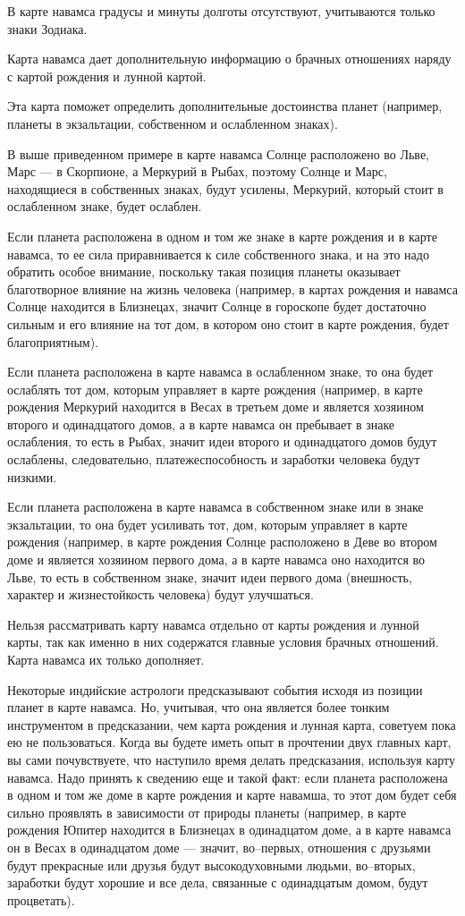 В карте навамса градусы и минуты долготы отсутствуют, учитываются только знаки Зодиака.

Карта навамса дает дополнительную информацию о брачных отношениях наряду с картой рождения и лунной картой.

Эта карта поможет определить дополнительные достоинства планет (например, планеты в экзальтации, собственном и ослабленном знаках).

В выше приведенном примере в карте навамса Солнце расположено во Льве, Марс --- в Скорпионе, а Меркурий в Рыбах, поэтому Солнце и Марс, находящиеся в собственных знаках, будут усилены, Меркурий, который стоит в ослабленном знаке, будет ослаблен.

Если планета расположена в одном и том же знаке в карте рождения и в карте навамса, то ее сила приравнивается к силе собственного знака, и на это надо обратить особое внимание, поскольку такая позиция планеты оказывает благотворное влияние на жизнь человека (например, в картах рождения и навамса Солнце находится в Близнецах, значит Солнце в гороскопе будет достаточно сильным и его влияние на тот дом, в котором оно стоит в карте рождения, будет благоприятным).

Если планета расположена в карте навамса в ослабленном знаке, то она будет ослаблять тот дом, которым управляет в карте рождения (например, в карте рождения Меркурий находится в Весах в третьем доме и является хозяином второго и одинадцатого домов, а в карте навамса он пребывает в знаке ослабления, то есть в Рыбах, значит идеи второго и одинадцатого домов будут ослаблены, следовательно, платежеспособность и заработки человека будут низкими.

Если планета расположена в карте навамса в собственном знаке или в знаке экзальтации, то она будет усиливать тот, дом, которым управляет в карте рождения (например, в карте рождения Солнце расположено в Деве во втором доме и является хозяином первого дома, а в карте навамса оно находится во Льве, то есть в собственном знаке, значит идеи первого дома (внешность, характер и жизнестойкость человека) будут улучшаться.

Нельзя рассматривать карту навамса отдельно от карты рождения и лунной карты, так как именно в них содержатся главные условия брачных отношений. Карта навамса их только дополняет.

Некоторые индийские астрологи предсказывают события исходя из позиции планет в карте навамса. Но, учитывая, что она является более тонким инструментом в предсказании, чем карта рождения и лунная карта, советуем пока ею не пользоваться. Когда вы будете иметь опыт в прочтении двух главных карт, вы сами почувствуете, что наступило время делать предсказания, используя карту навамса. Надо принять к сведению еще и такой факт: если планета расположена в одном и том же доме в карте рождения и карте навамша, то этот дом будет себя сильно проявлять в зависимости от природы планеты (например, в карте рождения Юпитер находится в Близнецах в одинадцатом доме, а в карте навамса он в Весах в одинадцатом доме --- значит, во--первых, отношения с друзьями будут прекрасные или друзья будут высокодуховными людьми, во--вторых, заработки будут хорошие и все дела, связанные с одинадцатым домом, будут процветать).

